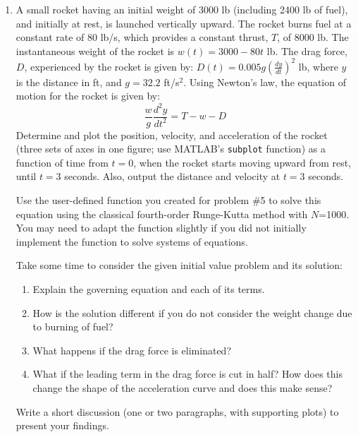 \begin{fullwidth}
\begin{enumerate}
\item A small rocket having an initial weight of 3000 lb (including 2400 lb of fuel), and initially at rest, is launched vertically upward.  The rocket burns fuel at a constant rate of 80 lb/s, which provides a constant thrust, $T$, of 8000 lb.  The instantaneous weight of the rocket is $w(t) = 3000 - 80t$ lb.  The drag force, $D$, experienced by the rocket is given by: $D(t) = 0.005g\left(\frac{dy}{dt}\right)^2$ lb, where $y$ is the distance in ft, and $g = 32.2$ ft/s$^2$.  Using Newton's law, the equation of motion for the rocket is given by:
\begin{equation*}
\frac{w}{g}\frac{d^2y}{dt^2}=T-w-D
\end{equation*}
Determine and plot the position, velocity, and acceleration of the rocket (three sets of axes in one figure; use MATLAB's \lstinline[style=myMatlab]{subplot} function) as a function of time from $t=0$, when the rocket starts moving upward from rest, until $t=3$ seconds.  Also, output the distance and velocity at $t=3$ seconds.

Use the user-defined function you created for problem \#5 to solve this equation using the classical fourth-order Runge-Kutta method with $N$=1000.  You may need to adapt the function slightly if you did not initially implement the function to solve systems of equations.  

Take some time to consider the given initial value problem and its solution:
\begin{enumerate}
\item Explain the governing equation and each of its terms.
\item How is the solution different if you do not consider the weight change due to burning of fuel?
\item What happens if the drag force is eliminated?
\item What if the leading term in the drag force is cut in half?  How does this change the shape of the acceleration curve and does this make sense?
\end{enumerate}

Write a short discussion (one or two paragraphs, with supporting plots) to present your findings.

\end{enumerate}

\end{fullwidth}
